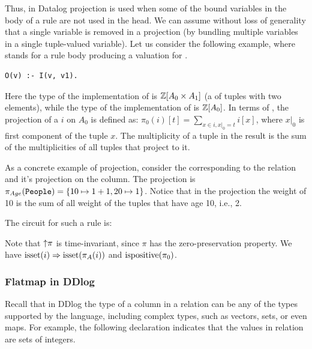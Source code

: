 Thus, in Datalog projection is used when some of the bound variables 
in the body of a rule are not used in the head.  We can assume without loss of 
generality that a single variable is removed in a projection (by bundling multiple
variables in a single tuple-valued variable).  
Let us consider the following example, where  stands for a rule body producing
a valuation for .

\begin{lstlisting}[language=ddlog]
O(v) :- I(v, v1).    
\end{lstlisting}

Here the type of the implementation of  is $\mathbb{Z}[A_0 \times A_1]$ (a \zr of tuples with 
two elements), while the type of the implementation of  is $\mathbb{Z}[A_0]$.  In terms of \zrs, the
projection of a \zr $i$ on $A_0$ is defined as: $\pi_0(i)[t] = \sum_{x \in i, x|_0 = t} i[x]$, 
where $x|_0$ is first component of the tuple $x$.  The multiplicity of a tuple in the result
is the sum of the multiplicities of all tuples that project to it.

As a concrete example of projection, consider the \zr corresponding to the 
 relation and it's projection on the  column.
The projection is $\pi_{Age}(\mbox{\texttt{People}}) = \{ 10 \mapsto 1 + 1, 20 \mapsto 1 \}$.
Notice that in the projection the weight of 10 is the sum of all weight of
the tuples that have age 10, i.e., 2.

The circuit for such a rule is:


Note that ${\uparrow}\pi$ is time-invariant, since $\pi$ has the zero-preservation
property.  We have $\mbox{isset}(i) \Rightarrow \mbox{isset}(\pi_A(i))$ and $\mbox{ispositive}(\pi_0)$.

\subsubsection{Flatmap in DDlog}\label{sec:flatmap}  

Recall that in DDlog the type of a column in a relation can be
any of the types supported by the language, including complex types,
such as vectors, sets, or even maps.  For example, the following
declaration indicates that the values in relation  are 
sets of integers.

